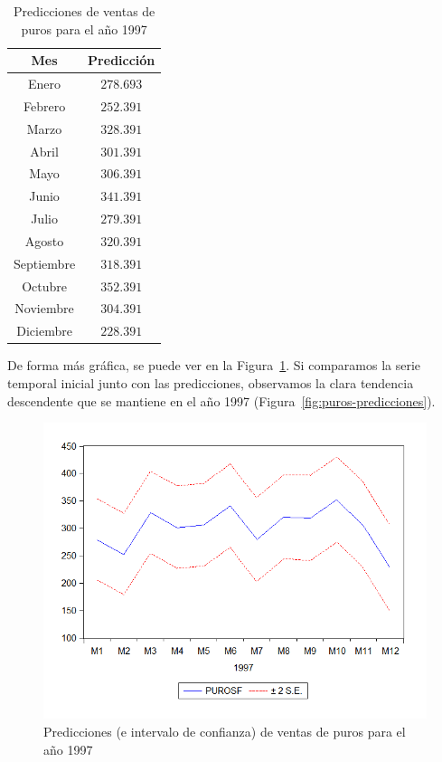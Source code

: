 \documentclass[12pt,a4paper,twoside,openright,titlepage,final]{article}
\begin{document}
\begin{table}[htbp!]
	\centering
	\caption{Predicciones de ventas de puros para el año 1997}
	\label{tbl:puros-predicciones}
	\begin{tabular}{@{}cc@{}}
		\toprule
		\textbf{Mes} & \textbf{Predicción} \\ \midrule
		Enero             & $278.693$          \\
		Febrero           & $252.391$          \\
		Marzo             & $328.391$          \\
		Abril             & $301.391$          \\
		Mayo              & $306.391$          \\
		Junio             & $341.391$          \\
		Julio             & $279.391$          \\
		Agosto            & $320.391$          \\
		Septiembre        & $318.391$          \\
		Octubre           & $352.391$          \\
		Noviembre         & $304.391$          \\
		Diciembre         & $228.391$          \\ \bottomrule
	\end{tabular}
\end{table}

De forma más gráfica, se puede ver en la Figura~\ref{fig:puros-predicciones-1997}. Si comparamos la serie temporal inicial junto con las predicciones, observamos la clara tendencia descendente que se mantiene en el año 1997 (Figura~\ref{fig:puros-predicciones}).\\

\begin{figure}[tbph!]
	\centering
	\includegraphics[width=0.8\linewidth]{imagenes/puros/puros-predicciones-1997.png}
	\caption{Predicciones (e intervalo de confianza) de ventas de puros para el año 1997}
	\label{fig:puros-predicciones-1997}
\end{figure}
\end{document}
